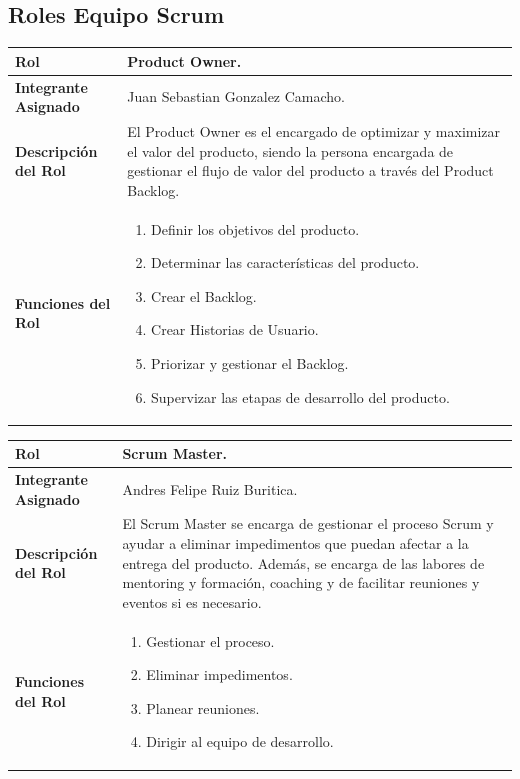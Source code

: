 \documentclass[12pt,a4paper]{article}
\begin{document}
\subsection{Roles Equipo Scrum}
\begin{center}
\begin{tabular}{|m{5cm}|m{9cm}|}
\hline
\textbf{Rol} & Product Owner. \\
\hline
\textbf{Integrante Asignado} & Juan Sebastian Gonzalez Camacho. \\
\hline
\textbf{Descripción del Rol} & El Product Owner es el encargado de optimizar y maximizar el valor del producto, siendo la persona encargada de gestionar el flujo de valor del producto a través del Product Backlog. \\
\hline
\textbf{Funciones del Rol} & \begin{enumerate}[noitemsep]
								 \item Definir los objetivos del producto.
								 \item Determinar las características del producto.
								 \item Crear el Backlog.
								 \item Crear Historias de Usuario.
								 \item Priorizar y gestionar el Backlog.
								 \item Supervizar las etapas de desarrollo del producto.	
							\end{enumerate} \\
\hline
\end{tabular}
\vspace{5mm}

\begin{tabular}{|m{5cm}|m{9cm}|}
\hline
\textbf{Rol} & Scrum Master. \\
\hline
\textbf{Integrante Asignado} & Andres Felipe Ruiz Buritica. \\
\hline
\textbf{Descripción del Rol} & El Scrum Master se encarga de gestionar el proceso Scrum y ayudar a eliminar impedimentos que puedan afectar a la entrega del producto. Además, se encarga de las labores de mentoring y formación, coaching y de facilitar reuniones y eventos si es necesario. \\
\hline
\textbf{Funciones del Rol} & \begin{enumerate}[noitemsep]
								 \item Gestionar el proceso.
								 \item Eliminar impedimentos.
								 \item Planear reuniones.
								 \item Dirigir al equipo de desarrollo.	
							\end{enumerate} \\
\hline
\end{tabular}
\vspace{5mm}


\end{center}
\end{document}

